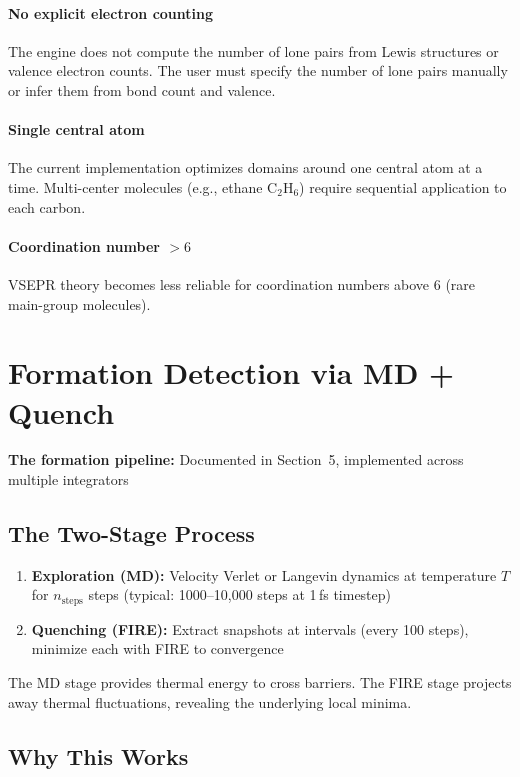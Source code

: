 \documentclass[11pt]{article}
\begin{document}
\paragraph{No explicit electron counting} The engine does not compute the number of lone pairs from Lewis structures or valence electron counts. The user must specify the number of lone pairs manually or infer them from bond count and valence.

\paragraph{Single central atom} The current implementation optimizes domains around one central atom at a time. Multi-center molecules (e.g., ethane C$_2$H$_6$) require sequential application to each carbon.

\paragraph{Coordination number $> 6$} VSEPR theory becomes less reliable for coordination numbers above 6 (rare main-group molecules).

\section{Formation Detection via MD + Quench}

\textbf{The formation pipeline:} Documented in Section~5, implemented across multiple integrators

\subsection{The Two-Stage Process}

\begin{enumerate}
\item \textbf{Exploration (MD):} Velocity Verlet or Langevin dynamics at temperature $T$ for $n_{\text{steps}}$ steps (typical: 1000--10,000 steps at 1\,fs timestep)

\item \textbf{Quenching (FIRE):} Extract snapshots at intervals (every 100 steps), minimize each with FIRE to convergence
\end{enumerate}

The MD stage provides thermal energy to cross barriers. The FIRE stage projects away thermal fluctuations, revealing the underlying local minima.

\subsection{Why This Works}
\end{document}
